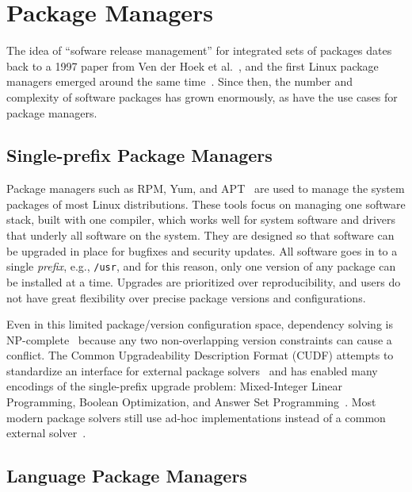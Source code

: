 \section{Package Managers}
\label{sec:package-managers}

The idea of ``sofware release management'' for integrated sets of packages dates back to
a 1997 paper from Ven der Hoek et al.~\cite{van1997software}, and the first Linux
package managers emerged around the same time~\cite{rpm,apt}. Since then, the number and
complexity of software packages has grown enormously, as have the use cases for package
managers.

\subsection{Single-prefix Package Managers}

Package managers such as RPM, Yum, and APT~\cite{foster+:rpm03,silva:apt01,yum} are used
to manage the system packages of most Linux distributions. These tools focus on managing
one software stack, built with one compiler, which works well for system software and
drivers that underly all software on the system. They are designed so that software can
be upgraded in place for bugfixes and security updates. All software goes in to a single
{\it prefix}, e.g., {\tt /usr}, and for this reason, only one version of any package can
be installed at a time. Upgrades are prioritized over reproducibility, and users do not
have great flexibility over precise package versions and configurations.

Even in this limited package/version configuration space, dependency solving is
NP-complete~\cite{dicosmo:edos,mancinelli+:ase06-foss-distros} because any two
non-overlapping version constraints can cause a conflict. The Common Upgradeability
Description Format (CUDF) attempts to standardize an interface for external package
solvers~\cite{abate2012dependency,abate-2013-modular-package-manager} and has enabled
many encodings of the single-prefix upgrade problem: Mixed-Integer Linear Programming,
Boolean Optimization, and Answer Set
Programming~\cite{tucker+:icse07-opium,michel+:lococo2010,argelich+:lococo2010,gebser+:2011-aspcud}.
Most modern package solvers still use ad-hoc implementations instead of a common
external solver~\cite{abate2020dependency}.

\subsection{Language Package Managers}

